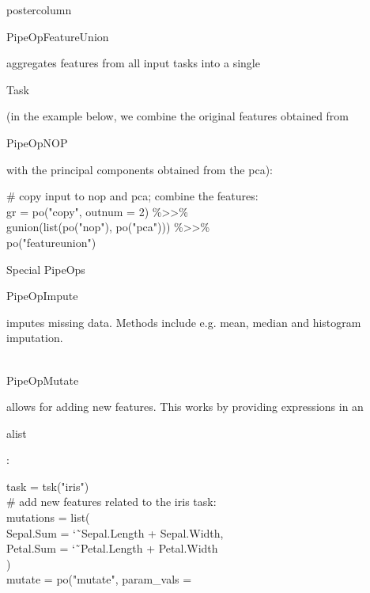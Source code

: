 \documentclass{beamer}
\newlength{\columnheight} %
\newcommand{\codeinline}[1]{\begin{codeboxinline}#1\end{codeboxinline}}
\begin{document}
\begin{frame}[fragile]{}
	\begin{columns}
		\begin{column}{.245\textwidth}
			\begin{beamercolorbox}[center]{postercolumn}
				\begin{minipage}{.98\textwidth}
					\parbox[t][\columnheight]{\textwidth}{
            \codeinline{PipeOpFeatureUnion} aggregates features from all input tasks into a single \codeinline{Task} (in the example below, we combine the original features obtained from \codeinline{PipeOpNOP} with the principal components obtained from the pca):
              \begin{codeboxexample}
						    {\footnotesize
                  \# copy input to nop and pca; combine the features:\\
                  gr = po("copy", outnum = 2) \%>{}>\%\\
                  \hspace*{1ex} gunion(list(po("nop"), po("pca"))) \%>{}>\%\\
                  \hspace*{1ex} po("featureunion")}
              \end{codeboxexample}
              \begin{myblock}{Special PipeOps}
                \codeinline{PipeOpImpute} imputes missing data. Methods include e.g. mean, median and histogram imputation.\\
                \ \\
                \codeinline{PipeOpMutate} allows for adding new features. This works by providing expressions in an \codeinline{alist}:
                \begin{codeboxexample}
                  \footnotesize{
                  task = tsk("iris")\\
                  \# add new features related to the iris task:\\
                  mutations = list(\\
                  \hspace*{1ex} Sepal.Sum = \char`\~ \ Sepal.Length + Sepal.Width,\\
                  \hspace*{1ex} Petal.Sum = \char`\~ \ Petal.Length + Petal.Width\\
                  )\\
                  mutate = po("mutate", param\_vals =\\
}
\end{codeboxexample}
\end{myblock}}
\end{minipage}
\end{beamercolorbox}
\end{column}
\end{columns}
\end{frame}
\end{document}
